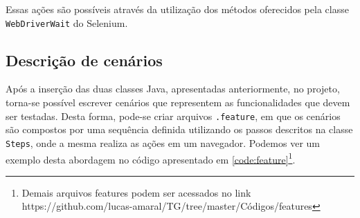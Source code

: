 \documentclass[tg]{mdtufsm}
\begin{document}
Essas ações são possíveis através da utilização dos métodos oferecidos pela classe \texttt{WebDriverWait} do Selenium.

\subsection{Descrição de cenários}
Após a inserção das duas classes Java, apresentadas anteriormente, no projeto, torna-se possível escrever cenários que representem as funcionalidades que devem ser testadas.
Desta forma, pode-se criar arquivos \texttt{.feature}, em que os cenários são compostos por uma sequência definida utilizando os passos descritos na classe \texttt{Steps}, onde a mesma realiza as ações em um navegador.
Podemos ver um exemplo desta abordagem no código apresentado em \ref{code:feature}\footnote{Demais arquivos features podem ser acessados no link https://github.com/lucas-amaral/TG/tree/master/Códigos/features}.
\end{document}
